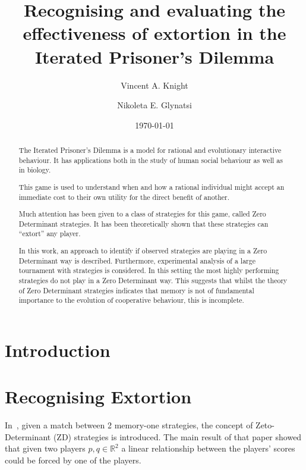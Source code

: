 \documentclass[a4paper]{article}
\title{Recognising and evaluating the effectiveness
       of extortion in the Iterated Prisoner's Dilemma}
\author{Vincent A. Knight \and Nikoleta E. Glynatsi}
\date{\today}
\begin{document}
\maketitle

\begin{abstract}
    The Iterated Prisoner's Dilemma is a model for rational and evolutionary
    interactive behaviour. It has applications both in the study of human social
    behaviour as well as in biology.

    This game is used to understand when and how a rational individual might
    accept an immediate cost to their own utility for the direct benefit of
    another.

    Much attention has been given to a class of strategies for this game, called
    Zero Determinant strategies. It has been theoretically shown that these
    strategies can ``extort'' any player.

    In this work, an approach to identify if observed strategies are playing in
    a Zero Determinant way is described. Furthermore, experimental analysis of
    a large tournament with 
    strategies is considered. In this setting
    the most highly performing strategies do not play in a Zero Determinant way.
    This suggests that whilst the theory of Zero Determinant strategies
    indicates that memory is not of fundamental importance to the evolution of
    cooperative behaviour, this is incomplete.
\end{abstract}

\section{Introduction}\label{sec:introduction}


\section{Recognising Extortion}\label{sec:delta-zd-strategies}

In~\cite{Press2012}, given a match between 2 memory-one strategies, the
concept of Zeto-Determinant (ZD) strategies is introduced. The main result of
that paper showed that given two players \(p, q\in\mathbb{R}^2\) a linear
relationship between the players' scores could be forced by one of the players.
\end{document}
